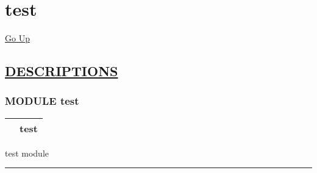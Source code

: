 \chapter*{\color{headfile}
test
}
\hypertarget{ecldoc:toc:test}{}
\hyperlink{ecldoc:toc:root}{Go Up}


\section*{\underline{\textsf{DESCRIPTIONS}}}
\subsection*{\textsf{\colorbox{headtoc}{\color{white} MODULE}
test}}

\hypertarget{ecldoc:test}{}

{\renewcommand{\arraystretch}{1.5}
\begin{tabularx}{\textwidth}{|>{\raggedright\arraybackslash}l|X|}
\hline
\hspace{0pt}\mytexttt{\color{red} } & \textbf{test} \\
\hline
\end{tabularx}
}

\par
test module


\rule{\linewidth}{0.5pt}
